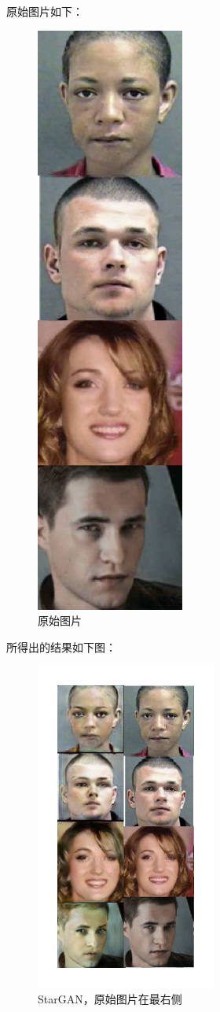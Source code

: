 \documentclass[12pt,a4paper]{article}
\begin{document}
原始图片如下：
\begin{figure}[H]
	\centering
	\includegraphics[scale=0.35]{assets/origin.png}
	\caption{原始图片}
\end{figure}


所得出的结果如下图：
\begin{figure}[H]
	\centering
	\includegraphics[scale=0.35]{assets/StarGAN.png}
	\caption{StarGAN，原始图片在最右侧}
\end{figure}
\end{document}
